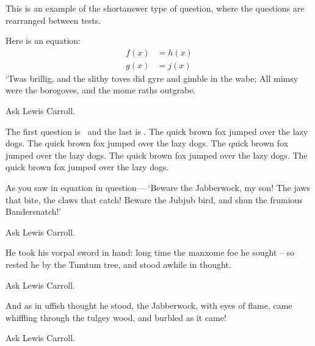 \documentclass[10pt]{examdesign}
\begin{document}
\begin{shortanswer}[title={Short Answer (10 pts each)},
                    rearrange=yes,resetcounter=no]
This is an example of the \textsf{shortanswer} type of question, where the
questions are rearranged between tests.

\begin{question}
  Here is an equation:
  \begin{align}
    f(x) &= h(x)\\
    g(x) &= j(x)
  \end{align}
  `Twas brillig, and the slithy toves  did gyre and gimble in the wabe;
  All mimsy were the borogoves, and the mome raths outgrabe.
  \begin{answer}
    Ask Lewis Carroll.
  \end{answer}
\end{question}

\begin{block}[questions=2]
  The first question is \thefirst\ and the last is \thelast.  The quick brown
  fox jumped over the lazy dogs.  The quick brown fox jumped over the lazy
  dogs.  The quick brown fox jumped over the lazy dogs.  The quick brown fox
  jumped over the lazy dogs.  The quick brown fox jumped over the lazy dogs.

  \begin{question}
    As you saw in equation in question---
    `Beware the Jabberwock, my son!  The jaws that bite, the claws that catch!
    Beware the Jubjub bird, and shun the frumious Bandersnatch!'
    \begin{answer}
      Ask Lewis Carroll.
    \end{answer}
  \end{question}

  \begin{question}
    He took his vorpal sword in hand: long time the manxome foe he sought --
    so rested he by the Tumtum tree,  and stood awhile in thought.
    \begin{answer}
      Ask Lewis Carroll.
    \end{answer}
  \end{question}
\end{block}

\begin{question}
  And as in uffish thought he stood, the Jabberwock, with eyes of flame,
  came whiffling through the tulgey wood, and burbled as it came!
  \begin{answer}
    Ask Lewis Carroll.
  \end{answer}
\end{question}


\end{shortanswer}
\end{document}
